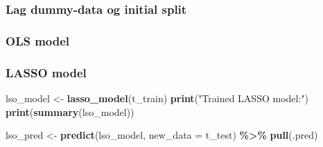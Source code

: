 \documentclass[
]{article}
\newenvironment{Shaded}{\begin{snugshade}}{\end{snugshade}}
\newcommand{\AttributeTok}[1]{\textcolor[rgb]{0.13,0.29,0.53}{#1}}
\newcommand{\FunctionTok}[1]{\textcolor[rgb]{0.13,0.29,0.53}{\textbf{#1}}}
\newcommand{\NormalTok}[1]{#1}
\newcommand{\OtherTok}[1]{\textcolor[rgb]{0.56,0.35,0.01}{#1}}
\newcommand{\SpecialCharTok}[1]{\textcolor[rgb]{0.81,0.36,0.00}{\textbf{#1}}}
\newcommand{\StringTok}[1]{\textcolor[rgb]{0.31,0.60,0.02}{#1}}
\begin{document}
\subsubsection{Lag dummy-data og initial
split}\label{lag-dummy-data-og-initial-split}

\begin{Shaded}
\end{Shaded}

\subsubsection{OLS model}\label{ols-model}

\begin{Shaded}
\end{Shaded}

\subsubsection{LASSO model}\label{lasso-model}

\begin{Shaded}
\begin{Highlighting}[]
\NormalTok{lso\_model }\OtherTok{\textless{}{-}} \FunctionTok{lasso\_model}\NormalTok{(t\_train)}
  \FunctionTok{print}\NormalTok{(}\StringTok{"Trained LASSO model:"}\NormalTok{)}
  \FunctionTok{print}\NormalTok{(}\FunctionTok{summary}\NormalTok{(lso\_model))}

\NormalTok{  lso\_pred }\OtherTok{\textless{}{-}} \FunctionTok{predict}\NormalTok{(lso\_model, }\AttributeTok{new\_data =}\NormalTok{ t\_test) }\SpecialCharTok{\%\textgreater{}\%} \FunctionTok{pull}\NormalTok{(.pred)}
\end{Highlighting}
\end{Shaded}
\end{document}
